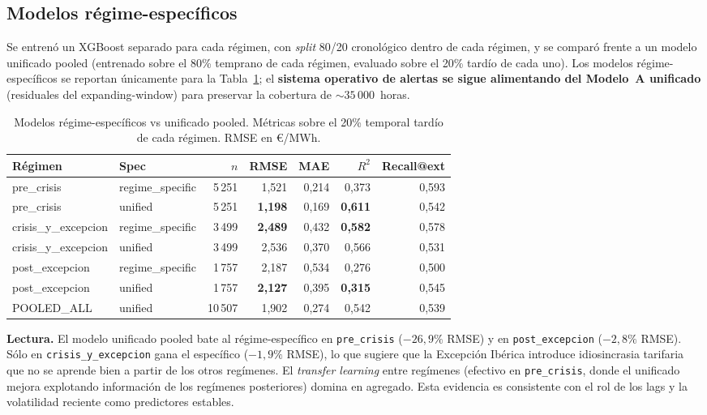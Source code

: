 \documentclass[11pt,a4paper]{article}
\begin{document}
\subsection{Modelos régime-específicos}\label{sec:regime-specific}

Se entrenó un XGBoost separado para cada régimen, con \emph{split} 80/20
cronológico dentro de cada régimen, y se comparó frente a un modelo
unificado pooled (entrenado sobre el 80\% temprano de cada régimen,
evaluado sobre el 20\% tardío de cada uno). Los modelos
régime-específicos se reportan únicamente para la Tabla~\ref{tab:t3}; el
\textbf{sistema operativo de alertas se sigue alimentando del Modelo~A
unificado} (residuales del expanding-window) para preservar la cobertura
de $\sim 35\,000$~horas.

\begin{table}[H]
\centering
\small
\caption{Modelos régime-específicos vs unificado pooled. Métricas sobre
el 20\% temporal tardío de cada régimen. RMSE en €/MWh.}
\label{tab:t3}
\begin{tabular}{llrrrrr}
\toprule
\textbf{Régimen} & \textbf{Spec} & \textbf{$n$} & \textbf{RMSE} & \textbf{MAE} & \textbf{$R^2$} & \textbf{Recall@ext} \\
\midrule
pre\_crisis        & regime\_specific & 5\,251 & 1{,}521 & 0{,}214 & 0{,}373 & 0{,}593 \\
pre\_crisis        & unified          & 5\,251 & \textbf{1{,}198} & 0{,}169 & \textbf{0{,}611} & 0{,}542 \\
\midrule
crisis\_y\_excepcion & regime\_specific & 3\,499 & \textbf{2{,}489} & 0{,}432 & \textbf{0{,}582} & 0{,}578 \\
crisis\_y\_excepcion & unified          & 3\,499 & 2{,}536 & 0{,}370 & 0{,}566 & 0{,}531 \\
\midrule
post\_excepcion    & regime\_specific & 1\,757 & 2{,}187 & 0{,}534 & 0{,}276 & 0{,}500 \\
post\_excepcion    & unified          & 1\,757 & \textbf{2{,}127} & 0{,}395 & \textbf{0{,}315} & 0{,}545 \\
\midrule
POOLED\_ALL        & unified          & 10\,507 & 1{,}902 & 0{,}274 & 0{,}542 & 0{,}539 \\
\bottomrule
\end{tabular}
\end{table}

\noindent\textbf{Lectura.} El modelo unificado pooled bate al
régime-específico en \texttt{pre\_crisis} ($-26{,}9\%$ RMSE) y en
\texttt{post\_excepcion} ($-2{,}8\%$ RMSE). Sólo en
\texttt{crisis\_y\_excepcion} gana el específico ($-1{,}9\%$ RMSE), lo
que sugiere que la Excepción Ibérica introduce idiosincrasia tarifaria
que no se aprende bien a partir de los otros regímenes. El \emph{transfer
learning} entre regímenes (efectivo en \texttt{pre\_crisis}, donde el
unificado mejora explotando información de los regímenes posteriores)
domina en agregado. Esta evidencia es consistente con el rol de los lags
y la volatilidad reciente como predictores estables.
\end{document}

